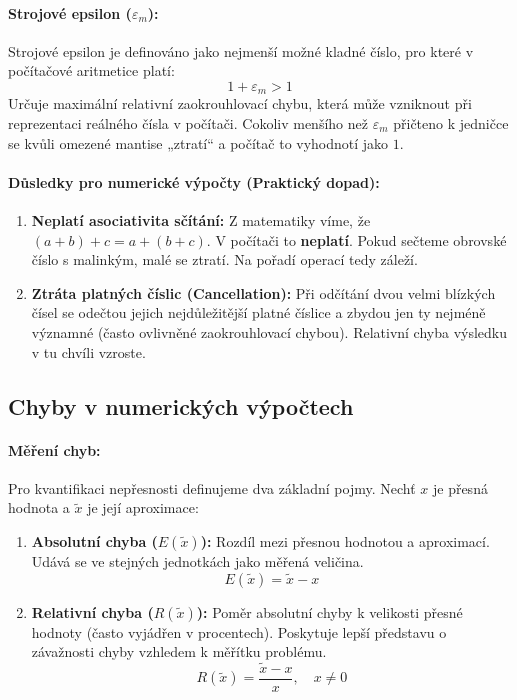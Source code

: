 \paragraph*{Strojové epsilon ($\varepsilon_m$):}
Strojové epsilon je definováno jako nejmenší možné kladné číslo, pro které v počítačové aritmetice platí:
\[ 1 + \varepsilon_m > 1 \]
Určuje maximální relativní zaokrouhlovací chybu, která může vzniknout při reprezentaci reálného čísla v počítači. Cokoliv menšího než $\varepsilon_m$ přičteno k jedničce se kvůli omezené mantise „ztratí“ a počítač to vyhodnotí jako $1$.

\paragraph*{Důsledky pro numerické výpočty (Praktický dopad):}
\begin{enumerate}
    \item \textbf{Neplatí asociativita sčítání:} Z matematiky víme, že $(a + b) + c = a + (b + c)$. V počítači to \textbf{neplatí}. Pokud sečteme obrovské číslo s malinkým, malé se ztratí. Na pořadí operací tedy záleží.
    \item \textbf{Ztráta platných číslic (Cancellation):} Při odčítání dvou velmi blízkých čísel se odečtou jejich nejdůležitější platné číslice a zbydou jen ty nejméně významné (často ovlivněné zaokrouhlovací chybou). Relativní chyba výsledku v tu chvíli vzroste.
\end{enumerate}

\subsection{Chyby v numerických výpočtech}
\paragraph*{Měření chyb:}
Pro kvantifikaci nepřesnosti definujeme dva základní pojmy. Nechť $x$ je přesná hodnota a $\tilde{x}$ je její aproximace:
\begin{enumerate}
    \item \textbf{Absolutní chyba ($E(\tilde{x})$):} 
    Rozdíl mezi přesnou hodnotou a aproximací. Udává se ve stejných jednotkách jako měřená veličina.
    \[ E(\tilde{x}) = \tilde{x} - x \]
    \item \textbf{Relativní chyba ($R(\tilde{x})$):} 
    Poměr absolutní chyby k velikosti přesné hodnoty (často vyjádřen v procentech). Poskytuje lepší představu o závažnosti chyby vzhledem k měřítku problému.
    \[ R(\tilde{x}) = \frac{\tilde{x} - x}{x}, \quad x \neq 0 \]
\end{enumerate}

